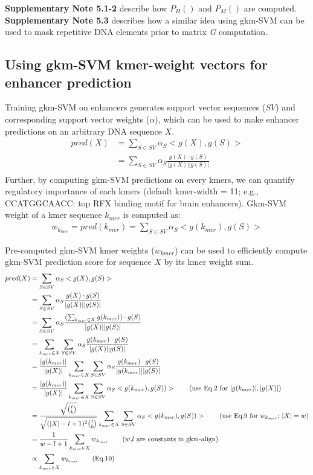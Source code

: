 \documentclass[english]{article}
\begin{document}
\textbf{Supplementary Note 5.1-2} describe how $P_H()$ and $P_M()$ are computed. \textbf{Supplementary Note 5.3} describes how a similar idea using gkm-SVM can be used to mask repetitive DNA elements prior to matrix \textit{G} computation.

 \subsection{Using gkm-SVM kmer-weight vectors for enhancer prediction}
 Training gkm-SVM on enhancers generates support vector sequences ($SV$) and corresponding support vector weights ($\alpha$), which can be used to make enhancer predictions on an arbitrary DNA sequence $X$. 
 \begin{align*}
     pred(X)&=\sum_{S \in SV} \alpha_S <g(X),g(S)> \\  &=\sum_{S \in SV} \alpha_S \frac{g(X)\cdot g(S)}{|g(X)||g(S)|} \\
 \end{align*}
 Further, by computing gkm-SVM predictions on every kmers, we can quantify regulatory importance of each kmers (default kmer-width = 11; e.g., CCATGGCAACC: top RFX binding motif for brain enhancers). Gkm-SVM weight of a kmer sequence $k_{mer}$ is computed as:
 \begin{align*}
     w_{k_{mer}} = pred(k_{mer}) = \sum_{S \in SV} \alpha_S <g(k_{mer}),g(S)> \tag{Eq.9}
 \end{align*}

Pre-computed gkm-SVM kmer weights ($w_{kmer}$) can be used to efficiently compute gkm-SVM prediction score for sequence $X$ by its kmer weight sum.
 \begin{align*}
     pred(X)&=\sum_{S \in SV} \alpha_S <g(X),g(S)> \\
     &=\sum_{S \in SV} \alpha_S \frac{g(X)\cdot g(S)}{|g(X)||g(S)|} \\
     &=\sum_{S \in SV} \alpha_S \frac{(\sum_{k_{mer} \in X}g(k_{mer}))\cdot g(S)}{|g(X)||g(S)|} \\
     &=\sum_{k_{mer} \in X} \sum_{S \in SV} \alpha_{S}\frac{g(k_{mer})\cdot g(S)}{|g(X)||g(S)|} \\
     &=\frac{|g(k_{mer})|}{|g(X)|}\sum_{k_{mer} \in X} \sum_{S \in SV} \alpha_{S}\frac{g(k_{mer})\cdot g(S)}{|g(k_{mer})||g(S)|} \\
     &=\frac{|g(k_{mer})|}{|g(X)|} \sum_{k_{mer} \in X} \sum_{S \in SV} \alpha_{S}<g(k_{mer}),g(S))> \tag{use Eq.2 for $|g(k_{mer})|, |g(X)|$} \\
     &=\frac{\sqrt{\binom{l}{k}}}{\sqrt{(|X|-l+1)^2\binom{l}{k}}} \sum_{k_{mer} \in X} \sum_{S \in SV} \alpha_{S}<g(k_{mer}),g(S))>  \tag{use Eq.9 for $w_{k_{mer}}$; $|X|=w$}\\
     &=\frac{1}{w-l+1} \sum_{k_{mer}\in X}w_{k_{mer}} \tag{$w$,$l$ are constants in gkm-align}\\
     &\propto \sum_{k_{mer}\in X}w_{k_{mer}} \tag{Eq.10}
 \end{align*}
\end{document}
